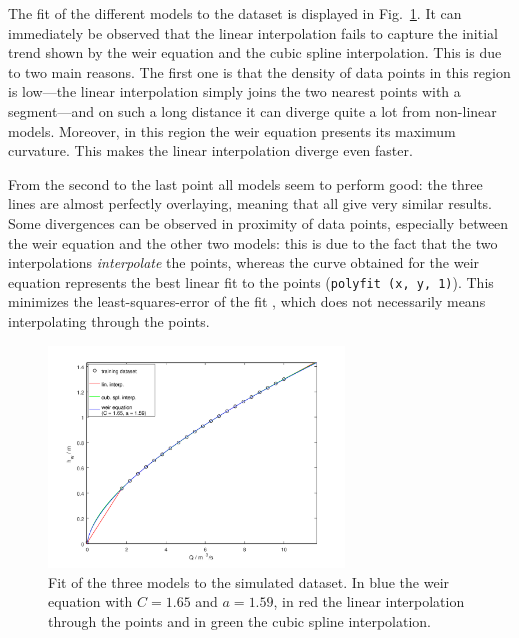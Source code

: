 The fit of the different models to the dataset is displayed in Fig.~\ref{fig:fitting_results}.
It can immediately be observed that the linear interpolation fails to capture the initial trend shown by the weir equation and the cubic spline interpolation.
This is due to two main reasons.
The first one is that the density of data points in this region is low---the linear interpolation simply joins the two nearest points with a segment---and on such a long distance it can diverge quite a lot from non-linear models.
Moreover, in this region the weir equation presents its maximum curvature.
This makes the linear interpolation diverge even faster.

From the second to the last point all models seem to perform good: the three lines are almost perfectly overlaying, meaning that all give very similar results.
Some divergences can be observed in proximity of data points, especially between the weir equation and the other two models: this is due to the fact that the two interpolations \emph{interpolate} the points, whereas the curve obtained for the weir equation represents the best linear fit to the points (\texttt{polyfit (x, y, 1)}).
This minimizes the least-squares-error of the fit \autocite{eaton_gnu_2016}, which does not necessarily means interpolating through the points.

\begin{figure}[h]
  \centering
  \includegraphics[width=0.7\textwidth]{Figures/fitting_results.png}
  \caption{Fit of the three models to the simulated dataset. In blue the weir equation with $C = \num{1.65}$ and $a = \num{1.59}$, in red the linear interpolation through the points and in green the cubic spline interpolation.}
  \label{fig:fitting_results}
\end{figure}

